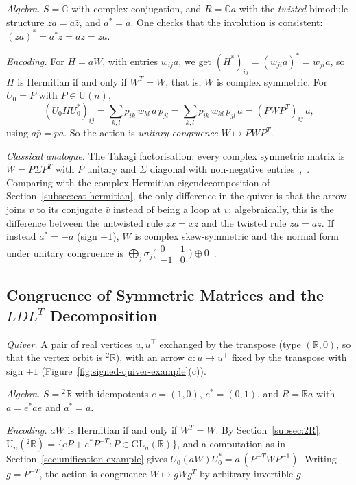 \documentclass[12pt, a4paper]{report}
\theoremstyle{plain}
\theoremstyle{definition}
\theoremstyle{remark}
\theoremstyle{plain}
\newcommand{\RR}{\mathbb{R}}
\newcommand{\CC}{\mathbb{C}}
\newcommand{\GL}{\mathrm{GL}}
\newcommand{\Un}{\mathrm{U}}
\newcommand{\twoR}{{}^{2}\mathbb{R}}
\begin{document}
\emph{Algebra.} $S=\CC$ with complex conjugation, and $R=\CC a$ with the \emph{twisted} bimodule structure $za=a\bar z$, and $a^*=a$. One checks that the involution is consistent: $(za)^*=a^*\bar z=a\bar z=za$.

\emph{Encoding.} For $H=aW$, with entries $w_{ij}a$, we get $(H^*)_{ij}=(w_{ji}a)^*=w_{ji}a$, so $H$ is Hermitian if and only if $W^T=W$, that is, $W$ is complex symmetric. For $U_0=P$ with $P\in\Un(n)$,
\[ (U_0HU_0^*)_{ij}=\sum_{k,l}p_{ik}\,w_{kl}\,a\,\bar p_{jl}=\sum_{k,l}p_{ik}\,w_{kl}\,p_{jl}\,a=(PWP^T)_{ij}\,a, \]
using $a\bar p=pa$. So the action is \emph{unitary congruence} $W\mapsto PWP^T$.

\emph{Classical analogue.} The Takagi factorisation: every complex symmetric matrix is $W=P\Sigma P^T$ with $P$ unitary and $\Sigma$ diagonal with non-negative entries~\cite{Takagi1925},~\cite[Corollary~4.4.4]{HornJohnson2013}. Comparing with the complex Hermitian eigendecomposition of Section~\ref{subsec:cat-hermitian}, the only difference in the quiver is that the arrow joins $v$ to its conjugate $\bar v$ instead of being a loop at $v$; algebraically, this is the difference between the untwisted rule $zx=xz$ and the twisted rule $za=a\bar z$. If instead $a^*=-a$ (sign $-1$), $W$ is complex skew-symmetric and the normal form under unitary congruence is $\bigoplus_j\sigma_j\bigl(\begin{smallmatrix}0&1\\-1&0\end{smallmatrix}\bigr)\oplus0$~\cite{Youla1961}.

\subsection{Congruence of Symmetric Matrices and the \texorpdfstring{$LDL^T$}{LDLT} Decomposition}
\label{subsec:cat-ldl}
\emph{Quiver.} A pair of real vertices $u,u^{\top}$ exchanged by the transpose (type $(\RR,0)$, so that the vertex orbit is $\twoR$), with an arrow $a:u\to u^{\top}$ fixed by the transpose with sign $+1$ (Figure~\ref{fig:signed-quiver-example}(c)).

\emph{Algebra.} $S=\twoR$ with idempotents $e=(1,0)$, $e^*=(0,1)$, and $R=\RR a$ with $a=e^*ae$ and $a^*=a$.

\emph{Encoding.} $aW$ is Hermitian if and only if $W^T=W$. By Section~\ref{subsec:2R}, $\Un_n(\twoR)=\{eP+e^*P^{-T}:P\in\GL_n(\RR)\}$, and a computation as in Section~\ref{sec:unification-example} gives $U_0(aW)U_0^*=a\,(P^{-T}WP^{-1})$. Writing $g=P^{-T}$, the action is congruence $W\mapsto gWg^T$ by arbitrary invertible $g$.
\end{document}
